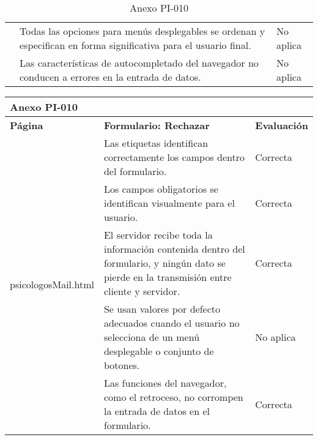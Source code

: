 \begin{table}[htpb]
\begin{tabularx}{\textwidth}{|l|X|l|}
                                      & Todas las opciones para menús desplegables se ordenan y especifican en forma significativa para el usuario final.                                         & No aplica           \\ \cline{2-3} 
                                      & Las características de autocompletado del navegador no conducen a errores en la entrada de datos.                                                         & No aplica           \\ \hline
\end{tabularx}
\caption{Anexo PI-010}
\end{table}


\begin{table}[htpb]
\centering
\begin{tabularx}{\textwidth}{|l|X|l|}
\hline
\multicolumn{3}{|l|}{\textbf{Anexo PI-010}}                                                                                                                                                                              \\ \hline
\textbf{Página}                       & \textbf{Formulario: Rechazar}                                                                                                                             & \textbf{Evaluación} \\ \hline
\multirow{10}{*}{psicologosMail.html} & Las etiquetas identifican correctamente los campos dentro del formulario.                                                                                 & Correcta            \\ \cline{2-3} 
                                      & Los campos obligatorios se identifican visualmente para el usuario.                                                                                       & Correcta            \\ \cline{2-3} 
                                      & El servidor recibe toda la información contenida dentro del formulario, y ningún dato se pierde en la transmisión entre cliente y servidor.               & Correcta            \\ \cline{2-3} 
                                      & Se usan valores por defecto adecuados cuando el usuario no selecciona de un menú desplegable o conjunto de botones.                                       & No aplica           \\ \cline{2-3} 
                                      & Las funciones del navegador, como el retroceso, no corrompen la entrada de datos en el formulario.                                                        & Correcta            \\ \cline{2-3} 

\end{tabularx}
\end{table}
